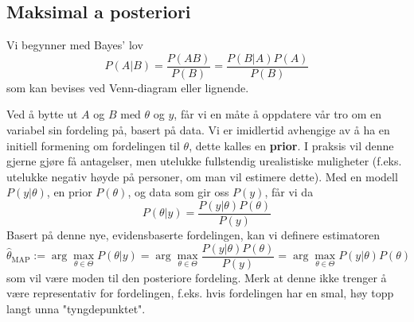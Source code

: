 \subsection{Maksimal a posteriori}
Vi begynner med Bayes' lov
\begin{equation}
P(A | B)=\frac{P(A B)}{P(B)} = \frac{P(B | A) P(A)}{P(B)}
\end{equation}
som kan bevises ved Venn-diagram eller lignende.

Ved å bytte ut $A$ og $B$ med $\theta$ og $y$, får vi en måte å oppdatere vår tro om en variabel sin fordeling på, basert på data. Vi er imidlertid avhengige av å ha en initiell formening om fordelingen til $\theta$, dette kalles en \textbf{prior}. I praksis vil denne gjerne gjøre få antagelser, men utelukke fullstendig urealistiske muligheter (f.eks. utelukke negativ høyde på personer, om man vil estimere dette). Med en modell $P(y | \theta)$, en prior $P(\theta)$, og data som gir oss $P(y)$, får vi da
\begin{equation}
P(\theta | y)=\frac{P(y | \theta) P(\theta)}{P(y)}
\end{equation}
Basert på denne nye, evidensbaserte fordelingen, kan vi definere estimatoren
\begin{equation}
\widehat{\theta}_{\mathrm{MAP}}:=\arg \max _{\theta \in \Theta} P(\theta | y)=\arg \max _{\theta \in \Theta} \frac{P(y | \theta) P(\theta)}{P(y)}=\arg \max _{\theta \in \Theta} P(y | \theta) P(\theta)
\end{equation}
som vil være moden til den posteriore fordeling. Merk at denne ikke trenger å være representativ for fordelingen, f.eks. hvis fordelingen har en smal, høy topp langt unna "tyngdepunktet".